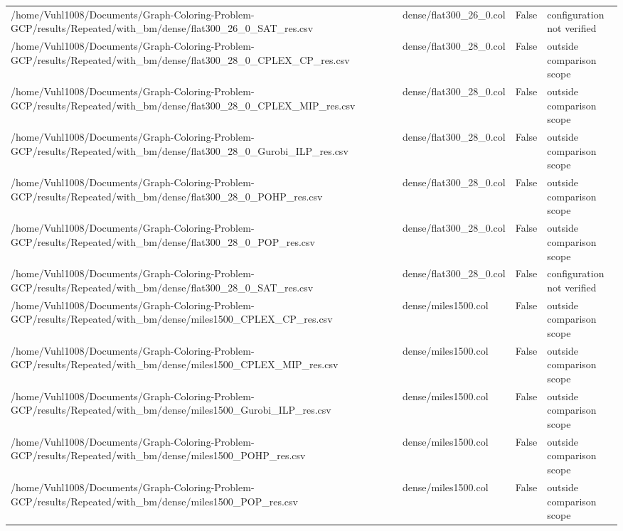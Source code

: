 \begin{table}[htbp]
\begin{tabular}{llll}
/home/Vuhl1008/Documents/Graph-Coloring-Problem-GCP/results/Repeated/with\_bm/dense/flat300\_26\_0\_SAT\_res.csv & dense/flat300\_26\_0.col & False & configuration not verified \\
/home/Vuhl1008/Documents/Graph-Coloring-Problem-GCP/results/Repeated/with\_bm/dense/flat300\_28\_0\_CPLEX\_CP\_res.csv & dense/flat300\_28\_0.col & False & outside comparison scope \\
/home/Vuhl1008/Documents/Graph-Coloring-Problem-GCP/results/Repeated/with\_bm/dense/flat300\_28\_0\_CPLEX\_MIP\_res.csv & dense/flat300\_28\_0.col & False & outside comparison scope \\
/home/Vuhl1008/Documents/Graph-Coloring-Problem-GCP/results/Repeated/with\_bm/dense/flat300\_28\_0\_Gurobi\_ILP\_res.csv & dense/flat300\_28\_0.col & False & outside comparison scope \\
/home/Vuhl1008/Documents/Graph-Coloring-Problem-GCP/results/Repeated/with\_bm/dense/flat300\_28\_0\_POHP\_res.csv & dense/flat300\_28\_0.col & False & outside comparison scope \\
/home/Vuhl1008/Documents/Graph-Coloring-Problem-GCP/results/Repeated/with\_bm/dense/flat300\_28\_0\_POP\_res.csv & dense/flat300\_28\_0.col & False & outside comparison scope \\
/home/Vuhl1008/Documents/Graph-Coloring-Problem-GCP/results/Repeated/with\_bm/dense/flat300\_28\_0\_SAT\_res.csv & dense/flat300\_28\_0.col & False & configuration not verified \\
/home/Vuhl1008/Documents/Graph-Coloring-Problem-GCP/results/Repeated/with\_bm/dense/miles1500\_CPLEX\_CP\_res.csv & dense/miles1500.col & False & outside comparison scope \\
/home/Vuhl1008/Documents/Graph-Coloring-Problem-GCP/results/Repeated/with\_bm/dense/miles1500\_CPLEX\_MIP\_res.csv & dense/miles1500.col & False & outside comparison scope \\
/home/Vuhl1008/Documents/Graph-Coloring-Problem-GCP/results/Repeated/with\_bm/dense/miles1500\_Gurobi\_ILP\_res.csv & dense/miles1500.col & False & outside comparison scope \\
/home/Vuhl1008/Documents/Graph-Coloring-Problem-GCP/results/Repeated/with\_bm/dense/miles1500\_POHP\_res.csv & dense/miles1500.col & False & outside comparison scope \\
/home/Vuhl1008/Documents/Graph-Coloring-Problem-GCP/results/Repeated/with\_bm/dense/miles1500\_POP\_res.csv & dense/miles1500.col & False & outside comparison scope \\

\end{tabular}
\end{table}
